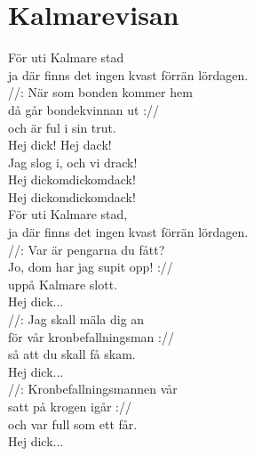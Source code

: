 \section{Kalmarevisan}
För uti Kalmare stad\\
ja där finns det ingen kvast förrän lördagen.\\

//: När som bonden kommer hem\\
då går bondekvinnan ut ://\\
och är ful i sin trut.\\
Hej dick! Hej dack!\\
Jag slog i, och vi drack!\\
Hej dickomdickomdack!\\
Hej dickomdickomdack!\\
För uti Kalmare stad,\\
ja där finns det ingen kvast förrän lördagen.\\

//: Var är pengarna du fått?\\
Jo, dom har jag supit opp! ://\\
uppå Kalmare slott.\\
Hej dick...\\

//: Jag skall mäla dig an\\
för vår kronbefallningsman ://\\
så att du skall få skam.\\
Hej dick...\\

//: Kronbefallningsmannen vår\\
satt på krogen igår ://\\
och var full som ett får.\\
Hej dick...\\